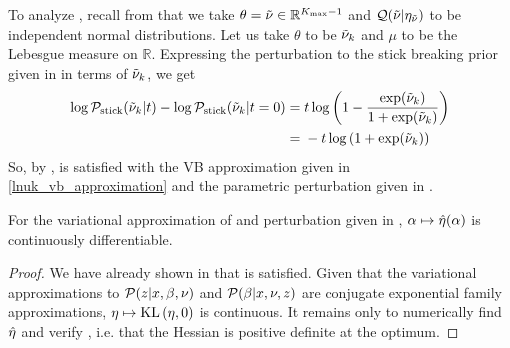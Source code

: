 \begin{ex}
%
To analyze , recall from 
that we take $\theta = \tilde{\nu} \in \mathbb{R}^{{K_{\mathrm{max}}} - 1}$ and $\mathcal{Q}(\tilde{\nu} \vert \eta_{\tilde{\nu}})$ to
be independent normal distributions.  Let us take $\theta$ to be $\tilde{\nu}_{k}$ and
$\mu$ to be the Lebesgue measure on $\mathbb{R}$.  Expressing the perturbation
to the stick breaking prior given in  in terms of
$\tilde{\nu}_{k}$, we get
%
\begin{align*}
%
\log \pstick(\lnuk \vert \t) - \log \pstick(\lnuk \vert \t=0) ={}&
%
\t \log\left(1 - \frac{\exp(\lnuk)}{1 + \exp(\lnuk)}\right)
\\={}&
-\t \log\left(1 + \exp(\lnuk)\right)
%
\end{align*}
%
So, by ,  is satisfied with
the VB approximation given in \eqref{lnuk_vb_approximation} and the parametric
perturbation given in .
%
\end{ex}




\begin{cor}
%
For the variational approximation of  and perturbation
given in , $\alpha \mapsto \hat\eta(\alpha)$
is continuously differentiable.
%
\begin{proof}
%
We have already shown in  that  is
satisfied.  Given that the variational approximations to $\mathcal{P}(z \vert x, \beta,
\nu)$ and $\mathcal{P}(\beta \vert x, \nu, z)$ are conjugate exponential family
approximations, $\eta \mapsto \mathrm{KL}\left(\eta, 0\right)$ is continuous.  It remains only to
numerically find $\hat\eta$ and verify , i.e.
that the Hessian is positive definite at the optimum.
%
\end{proof}
%
\end{cor}

